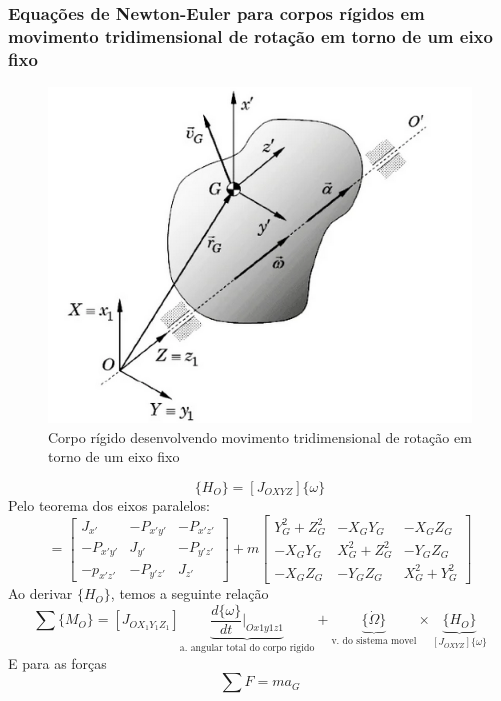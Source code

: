 \documentclass[a4paper, 12pt]{article}
\begin{document}
	\subsubsection{Equações de Newton-Euler para corpos rígidos em movimento tridimensional de rotação em torno de um eixo fixo}
		\begin{figure}[h]
			\center
			\includegraphics[scale=0.5]{imagens/a8.png} 
			\caption{Corpo rígido desenvolvendo movimento tridimensional de rotação em torno de um eixo fixo}
		\end{figure}
		\begin{equation}
			\{H_O\} = [J_{OXYZ}]\{\omega \}
		\end{equation}
		Pelo teorema dos eixos paralelos:
		\begin{equation}
			[J_{OXYZ}] = \begin{bmatrix}
			J_{x'} & -P_{x'y'} & -P_{x'z'}\\
			-P_{x'y'} & J_{y'} & -P_{y'z'}\\
			-p_{x'z'} & -P_{y'z'} & J_{z'}
			\end{bmatrix} + m\begin{bmatrix}
			 Y_G^2 + Z^2_G & -X_GY_G & -X_GZ_G\\
			 -X_GY_G & X^2_G+Z^2_G & -Y_GZ_G\\
			 -X_GZ_G & -Y_GZ_G & X^2_G + Y_G^2
			\end{bmatrix}
		\end{equation}
		Ao derivar $\{H_O\}$, temos a seguinte relação
		\begin{equation}
			\boxed{
			\sum \{M_O\} = [J_{OX_1Y_1Z_1}]\underbrace{\frac{d\{\omega \}}{dt}|_{Ox1y1z1}}_{\text{a. angular total do corpo rigido}} + \underbrace{\{\dot{\Omega} \}}_{\text{v. do sistema movel}} \times \underbrace{\{H_O\}}_{[J_{OXYZ}]\{\omega\}}
			}
		\end{equation}
		E para as forças
		\begin{equation}
			\sum F = ma_G
		\end{equation}
\end{document}
